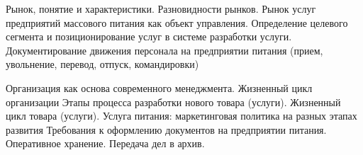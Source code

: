 \documentclass[
	11pt,
	a4paper,
	]
	{article}
\begin{document}
\bigskip

\noindent{} 
	{
		Рынок, понятие и характеристики. Разновидности рынков. Рынок услуг предприятий массового питания как объект управления.
	}{
		Определение целевого сегмента и позиционирование услуг в системе разработки услуги.
	}{
		Документирование движения персонала на предприятии питания (прием, увольнение, перевод, отпуск, командировки)
	}

\bigskip

\noindent{} 
	{
		Организация как основа современного менеджмента. Жизненный цикл организации
	}{
		Этапы процесса разработки нового товара (услуги). Жизненный цикл товара (услуги). Услуга питания: маркетинговая политика на разных этапах развития
	}{
		Требования к оформлению документов на предприятии питания. Оперативное хранение. Передача дел в архив.
	}

\bigskip
\end{document}
